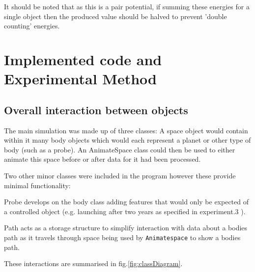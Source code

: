 \documentclass{article}
\begin{document}
             It should be noted that as this is a pair potential, if summing these energies for a 
             single object then the produced value should be halved to prevent 'double counting' 
             energies.



    \section{Implemented code and Experimental Method}
        \subsection{Overall interaction between objects}
            The main simulation was made up of three classes: A space object would contain within it 
            many body objects which would each represent a planet or other type of body (such as a 
            probe). An AnimateSpace class could then be used to either animate this space before or 
            after data for it had been processed.
            \par
            Two other minor classes were included in the program however these provide minimal 
            functionality:
            \par
            Probe develops on the body class adding features that would only be expected of a 
            controlled object (e.g. launching after two years as specified in experiment.3
            \cite[s. Solar 1.4.3]{CourseBook}).

            \par 
            Path acts as a storage structure to simplify interaction with data about
            a bodies path as it travels through space being used by \verb|Animatespace| to show 
            a bodies path.
            \par
            These interactions are summarised in fig.\ref{fig:classDiagram}.
\end{document}
